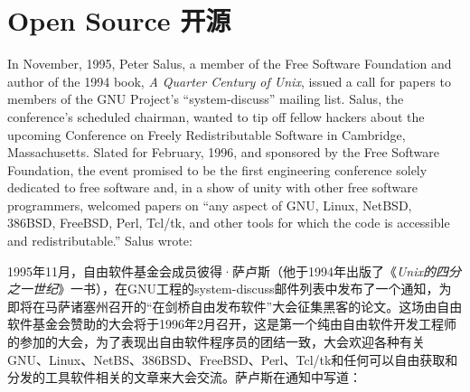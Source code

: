 

\chapter{\ifdefined\eng
Open Source
\fi
\ifdefined\chs
开源
\fi} \label{chapter:open source}

\ifdefined{}
\fi

\ifdefined{}
\fi

\ifdefined\eng
In November, 1995, Peter Salus, a member of the Free Software Foundation and author of the 1994 book, \textit{A Quarter Century of Unix}, issued a call for papers to members of the GNU Project's ``system-discuss'' mailing list. Salus, the conference's scheduled chairman, wanted to tip off fellow hackers about the upcoming Conference on Freely Redistributable Software in Cambridge, Massachusetts. Slated for February, 1996, and sponsored by the Free Software Foundation, the event promised to be the first engineering conference solely dedicated to free software and, in a show of unity with other free software programmers, welcomed papers on ``any aspect of GNU, Linux, NetBSD, 386BSD, FreeBSD, Perl, Tcl/tk, and other tools for which the code is accessible and redistributable.'' Salus wrote:
\fi

\ifdefined\chs
1995年11月，自由软件基金会成员彼得·萨卢斯（他于1994年出版了《\textit{Unix的四分之一世纪}》一书），在GNU工程的system-discuss邮件列表中发布了一个通知，为即将在马萨诸塞州召开的“在剑桥自由发布软件”大会征集黑客的论文。这场由自由软件基金会赞助的大会将于1996年2月召开，这是第一个纯由自由软件开发工程师的参加的大会，为了表现出自由软件程序员的团结一致，大会欢迎各种有关GNU、Linux、NetBS、386BSD、FreeBSD、Perl、Tcl/tk和任何可以自由获取和分发的工具软件相关的文章来大会交流。萨卢斯在通知中写道：
\fi

